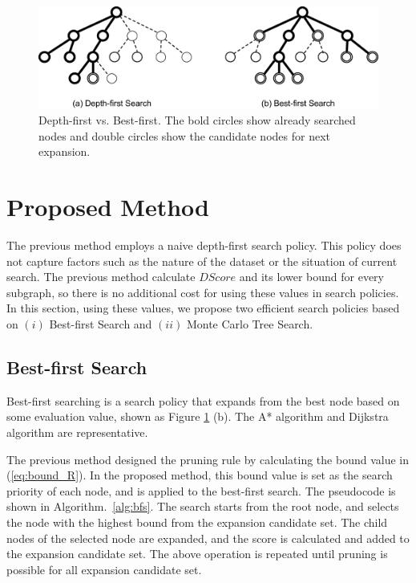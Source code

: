 \begin{figure}[t]
  	\centering
  	\includegraphics[width=0.9\linewidth]{img/search.eps}
	\caption{
		Depth-first vs. Best-first.
		The bold circles show already searched nodes and 
		double circles show the candidate nodes for next expansion.}
  	\label{fig:search}
\end{figure}

\section{Proposed Method}
The previous method \cite{Shirakawa:2018} employs a naive depth-first search policy. 
This policy does not capture factors such as the nature of the dataset or the situation of current search.
The previous method calculate $DScore$ and its lower bound for every subgraph, 
so there is no additional cost for using these values in search policies.
In this section, using these values, 
we propose two efficient search policies 
based on $(i)$ Best-first Search and $(ii)$ Monte Carlo Tree Search.

\subsection{Best-first Search}
Best-first searching \cite{pearl:1984} is a search policy 
that expands from the best node based on some evaluation value, shown as Figure \ref{fig:search} (b).
The A* algorithm \cite{hart:1968} and Dijkstra algorithm \cite{dijkstra:1959} are representative.

The previous method designed the pruning rule 
by calculating the bound value in (\ref{eq:bound_R}). 
In the proposed method, this bound value is set as the search priority of each node, 
and is applied to the best-first search.
The pseudocode is shown in Algorithm.~\ref{alg:bfs}.
The search starts from the root node, 
and selects the node with the highest bound from the expansion candidate set.
The child nodes of the selected node are expanded, 
and the score is calculated and added to the expansion candidate set.
The above operation is repeated until pruning is possible for all expansion candidate set.\\

